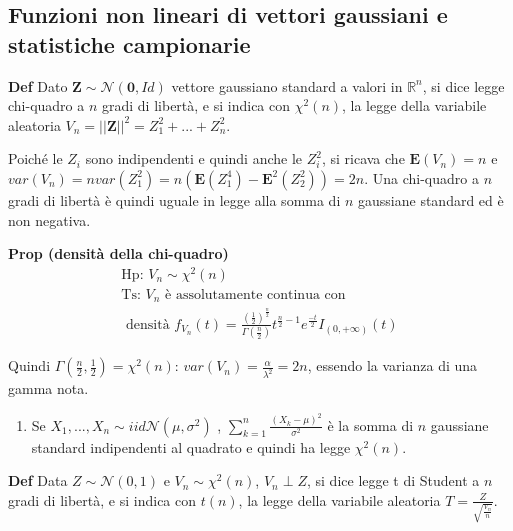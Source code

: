 \documentclass{article}
\begin{document}
\subsection{Funzioni non lineari di vettori gaussiani e statistiche
campionarie}

\textbf{Def} Dato $\mathbf{Z}\sim \mathcal{N}\left( \mathbf{0},Id\right) $
vettore gaussiano standard a valori in $%
\mathbb{R}
^{n}$, si dice legge chi-quadro a $n$ gradi di libert\`{a}, e si indica con $%
\chi ^{2}\left( n\right) $, la legge della variabile aleatoria $%
V_{n}=\left\vert \left\vert \mathbf{Z}\right\vert \right\vert
^{2}=Z_{1}^{2}+...+Z_{n}^{2}$.

Poich\'{e} le $Z_{i}$ sono indipendenti e quindi anche le $Z_{i}^{2}$, si
ricava che $\mathbf{E}\left( V_{n}\right) =n$ e $var\left( V_{n}\right)
=nvar\left( Z_{1}^{2}\right) =n\left( \mathbf{E}\left( Z_{1}^{4}\right) -%
\mathbf{E}^{2}\left( Z_{2}^{2}\right) \right) =2n$. Una chi-quadro a $n$
gradi di libert\`{a} \`{e} quindi uguale in legge alla somma di $n$
gaussiane standard ed \`{e} non negativa.

\textbf{Prop (densit\`{a} della chi-quadro)}%
\begin{gather*}
\text{Hp: }V_{n}\sim \chi ^{2}\left( n\right) \\
\text{Ts: }V_{n}\text{ \`{e} assolutamente continua con} \\
\text{ densit\`{a} }f_{V_{n}}\left( t\right) =\frac{\left( \frac{1}{2}%
\right) ^{\frac{n}{2}}}{\Gamma \left( \frac{n}{2}\right) }t^{\frac{n}{2}%
-1}e^{\frac{-t}{2}}I_{\left( 0,+\infty \right) }\left( t\right)
\end{gather*}

Quindi $\Gamma \left( \frac{n}{2},\frac{1}{2}\right) =\chi ^{2}\left(
n\right) $: $var\left( V_{n}\right) =\frac{\alpha }{\lambda ^{2}}=2n$,
essendo la varianza di una gamma nota.

\begin{enumerate}
\item Se $X_{1},...,X_{n}\sim iid\mathcal{N}\left( \mu ,\sigma ^{2}\right) $%
, $\sum_{k=1}^{n}\frac{\left( X_{k}-\mu \right) ^{2}}{\sigma ^{2}}$ \`{e} la
somma di $n$ gaussiane standard indipendenti al quadrato e quindi ha legge $%
\chi ^{2}\left( n\right) $.
\end{enumerate}

\textbf{Def} Data $Z\sim \mathcal{N}\left( 0,1\right) $ e $V_{n}\sim \chi
^{2}\left( n\right) $, $V_{n}\perp Z$, si dice legge t di Student a $n$
gradi di libert\`{a}, e si indica con $t\left( n\right) $, la legge della
variabile aleatoria $T=\frac{Z}{\sqrt{\frac{V_{n}}{n}}}$.
\end{document}
